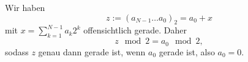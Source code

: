 Wir haben
$$z:= (a_{N-1} \dots a_0)_2 = a_0 + x$$
mit $x = \sum_{k=1}^{N-1}a_k 2^k$ offensichtlich gerade. Daher
$$z \mod 2 = a_0 \mod 2,$$
sodass $z$ genau dann gerade ist, wenn $a_0$ gerade ist, also $a_0 = 0$.
